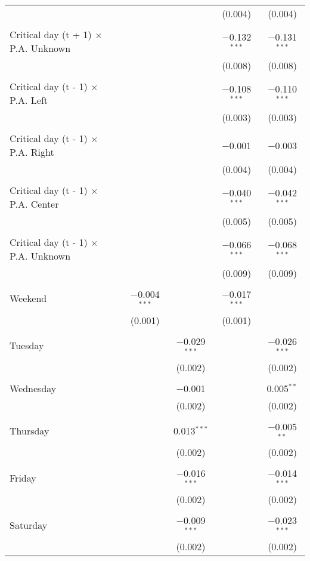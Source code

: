 \documentclass[
]{article}
\begin{document}
\begin{table}[!htbp]
{\begin{tabular}{@{\extracolsep{5pt}}lcccc}
  &  &  & (0.004) & (0.004) \\ 
  & & & & \\ 
 Critical day (t + 1) $\times$ P.A. Unknown &  &  & $-$0.132$^{***}$ & $-$0.131$^{***}$ \\ 
  &  &  & (0.008) & (0.008) \\ 
  & & & & \\ 
 Critical day (t - 1) $\times$ P.A. Left &  &  & $-$0.108$^{***}$ & $-$0.110$^{***}$ \\ 
  &  &  & (0.003) & (0.003) \\ 
  & & & & \\ 
 Critical day (t - 1) $\times$ P.A. Right &  &  & $-$0.001 & $-$0.003 \\ 
  &  &  & (0.004) & (0.004) \\ 
  & & & & \\ 
 Critical day (t - 1) $\times$ P.A. Center &  &  & $-$0.040$^{***}$ & $-$0.042$^{***}$ \\ 
  &  &  & (0.005) & (0.005) \\ 
  & & & & \\ 
 Critical day (t - 1) $\times$ P.A. Unknown &  &  & $-$0.066$^{***}$ & $-$0.068$^{***}$ \\ 
  &  &  & (0.009) & (0.009) \\ 
  & & & & \\ 
 Weekend & $-$0.004$^{***}$ &  & $-$0.017$^{***}$ &  \\ 
  & (0.001) &  & (0.001) &  \\ 
  & & & & \\ 
 Tuesday &  & $-$0.029$^{***}$ &  & $-$0.026$^{***}$ \\ 
  &  & (0.002) &  & (0.002) \\ 
  & & & & \\ 
 Wednesday &  & $-$0.001 &  & 0.005$^{**}$ \\ 
  &  & (0.002) &  & (0.002) \\ 
  & & & & \\ 
 Thursday &  & 0.013$^{***}$ &  & $-$0.005$^{**}$ \\ 
  &  & (0.002) &  & (0.002) \\ 
  & & & & \\ 
 Friday &  & $-$0.016$^{***}$ &  & $-$0.014$^{***}$ \\ 
  &  & (0.002) &  & (0.002) \\ 
  & & & & \\ 
 Saturday &  & $-$0.009$^{***}$ &  & $-$0.023$^{***}$ \\ 
  &  & (0.002) &  & (0.002) \\ 

\end{tabular}}
\end{table}
\end{document}
